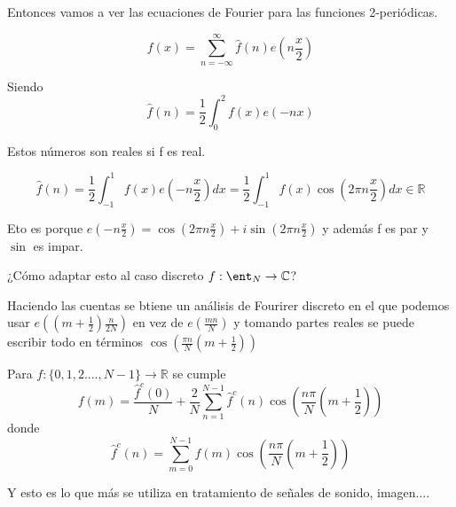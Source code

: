 \begin{itemize}
	
	Entonces vamos a ver las ecuaciones de Fourier para las funciones 2-periódicas.
	
	$$f(x) = \sum_{n=-\infty}^{\infty} \widehat{f}(n)e(n\frac{x}{2})$$
	
	Siendo
	$$\widehat{f}(n) = \frac{1}{2} \int_{0}^{2} f(x) e(-nx)$$
	
	Estos números son reales si f es real.
	
	$$\widehat{f}(n) = \frac{1}{2} \int_{-1}^{1} f(x) e(-n\frac{x}{2}) dx = \frac{1}{2} \int_{-1}^{1} f(x)\cos(2\pi n \frac{x}{2})dx \in \mathbb{R}$$
	
	Eto es porque $e(-n\frac{x}{2}) = \cos(2\pi n \frac{x}{2}) + i \sin(2\pi n \frac{x}{2})$ y además f es par y $\sin$ es impar.
	
	¿Cómo adaptar esto al caso discreto $f: \ent_N \rightarrow \mathbb{C}$?
	
	
	Haciendo las cuentas se btiene un análisis de Fourirer discreto en el que podemos usar $e((m + \frac{1}{2}) \frac{n}{2N})$ en vez de $e(\frac{mn}{N})$ y tomando partes reales se puede escribir todo en términos $\cos(\frac{\pi n}{N}(m+ \frac{1}{2}))$
	
	\begin{prop}
		Para $f : \{0,1,2....,N-1\} \rightarrow \mathbb{R}$ se cumple
		$$f(m) = \frac{\widehat{f}^c(0)}{N} + \frac{2}{N} \sum_{n=1}^{N-1} \widehat{f}^c(n) \cos(\frac{n\pi}{N}(m + \frac{1}{2}))$$
		donde
		$$\widehat{f}^c(n)= \sum_{m= 0}^{N-1} f(m) \cos(\frac{n\pi}{N}(m+ \frac{1}{2}))$$
	\end{prop}
	\obs Y esto es lo que más se utiliza en tratamiento de señales de sonido, imagen....
\end{itemize}
